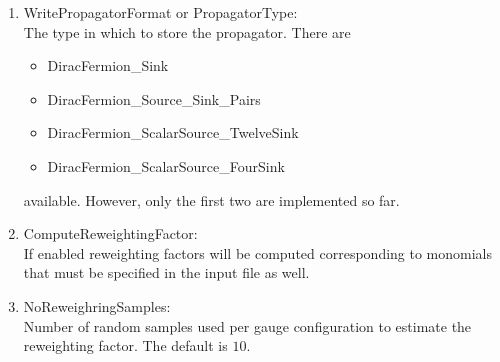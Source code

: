 \begin{enumerate}
\item {\ttfamily WritePropagatorFormat} or {\ttfamily PropagatorType}:\\
  The type in which to store the propagator. There are 
  \begin{itemize}
  \item {\ttfamily DiracFermion\_Sink}
  \item {\ttfamily DiracFermion\_Source\_Sink\_Pairs}
  \item {\ttfamily DiracFermion\_ScalarSource\_TwelveSink}
  \item {\ttfamily DiracFermion\_ScalarSource\_FourSink}
  \end{itemize}
  available. However, only the first two are implemented so far.

\item {\ttfamily ComputeReweightingFactor}:\\
  If enabled reweighting factors will be computed corresponding to
  monomials that must be specified in the input file as well.

\item {\ttfamily NoReweighringSamples}:\\
  Number of random samples used per gauge configuration to estimate
  the reweighting factor. The default is $10$.

\end{enumerate}


